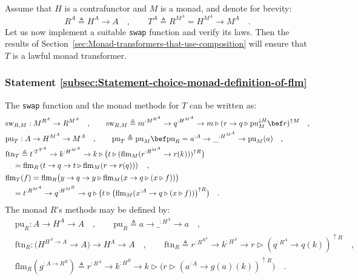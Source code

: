Assume that $H$ is a contrafunctor and $M$ is a monad, and denote
for brevity:
\[
R^{A}\triangleq H^{A}\rightarrow A\quad,\quad\quad T^{A}\triangleq R^{M^{A}}=H^{M^{A}}\rightarrow M^{A}\quad.
\]
Let us now implement a suitable \lstinline!swap! function and verify
its laws. Then the results of Section~\ref{sec:Monad-transformers-that-use-composition}
will ensure that $T$ is a lawful monad transformer. 

\subsubsection{Statement \label{subsec:Statement-choice-monad-definition-of-flm}\ref{subsec:Statement-choice-monad-definition-of-flm}}

The \lstinline!swap! function and the monad methods for $T$ can
be written as:
\begin{align}
 & \text{sw}_{R,M}:M^{R^{A}}\rightarrow R^{M^{A}}\quad,\quad\quad\text{sw}_{R,M}\triangleq m^{:M^{R^{A}}}\rightarrow q^{:H^{M^{A}}}\rightarrow m\triangleright(r\rightarrow q\triangleright\text{pu}_{M}^{\downarrow H}\bef r)^{\uparrow M}\quad,\label{eq:rigid-monad-short-formula-for-swap}\\
 & \text{pu}_{T}:A\rightarrow H^{M^{A}}\rightarrow M^{A}\quad,\quad\quad\text{pu}_{T}\triangleq\text{pu}_{M}\bef\text{pu}_{R}=a^{:A}\rightarrow\_^{:H^{M^{A}}}\rightarrow\text{pu}_{M}(a)\quad,\nonumber \\
 & \text{ftn}_{T}\triangleq t^{:T^{T^{A}}}\rightarrow k^{:H^{M^{A}}}\rightarrow k\triangleright\big(t\triangleright(\text{flm}_{M}(r^{:R^{M^{A}}}\rightarrow r(k)))^{\uparrow R}\big)\nonumber \\
 & \quad=\text{flm}_{R}\left(t\rightarrow q\rightarrow t\triangleright\text{flm}_{M}(r\rightarrow r(q))\right)\quad,\\
 & \text{flm}_{T}(f)=\text{flm}_{R}\big(y\rightarrow q\rightarrow y\triangleright\text{flm}_{M}(x\rightarrow q\triangleright(x\triangleright f))\big)\label{eq:rigid-monad-def-flm-t-via-flm-r}\\
 & \quad=t^{:R^{M^{A}}}\rightarrow q^{:H^{M^{B}}}\rightarrow q\triangleright\big(t\triangleright\big(\text{flm}_{M}(x^{:A}\rightarrow q\triangleright(x\triangleright f))\big)^{\uparrow R}\big)\quad.\label{eq:rigid-monad-flm-T-def}
\end{align}
The monad $R$\textsf{'}s methods may be defined by:
\begin{align}
 & \text{pu}_{R}:A\rightarrow H^{A}\rightarrow A\quad,\quad\quad\text{pu}_{R}\triangleq a\rightarrow\_^{:H^{A}}\rightarrow a\quad,\nonumber \\
 & \text{ftn}_{R}:(H^{H^{A}\rightarrow A}\rightarrow A\big)\rightarrow H^{A}\rightarrow A\quad,\quad\quad\text{ftn}_{R}\triangleq r^{:R^{R^{A}}}\rightarrow k^{:H^{A}}\rightarrow r\triangleright(q^{:R^{A}}\rightarrow q(k))^{\uparrow R}\quad,\nonumber \\
 & \text{flm}_{R}(g^{:A\rightarrow R^{B}})\triangleq r^{:R^{A}}\rightarrow k^{:H^{B}}\rightarrow k\triangleright\big(r\triangleright(a^{:A}\rightarrow g(a)(k))^{\uparrow R}\big)\quad.\label{eq:rigid-monad-flm-R-def}
\end{align}


